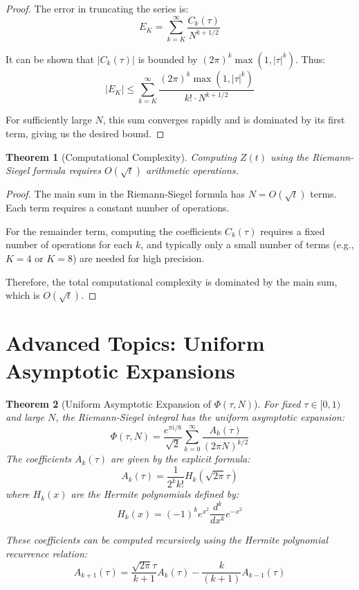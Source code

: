 \documentclass{article}
\newtheorem{theorem}{Theorem}
\begin{document}
\begin{proof}
The error in truncating the series is:
\[
E_K = \sum_{k=K}^{\infty} \frac{C_k(\tau)}{N^{k+1/2}}
\]

It can be shown that $|C_k(\tau)|$ is bounded by $(2\pi)^k \max(1, |\tau|^k)$. Thus:
\[
|E_K| \leq \sum_{k=K}^{\infty} \frac{(2\pi)^k \max(1, |\tau|^k)}{k! \cdot N^{k+1/2}}
\]

For sufficiently large $N$, this sum converges rapidly and is dominated by its first term, giving us the desired bound.
\end{proof}

\begin{theorem}[Computational Complexity]
Computing $Z(t)$ using the Riemann-Siegel formula requires $O(\sqrt{t})$ arithmetic operations.
\end{theorem}

\begin{proof}
The main sum in the Riemann-Siegel formula has $N = O(\sqrt{t})$ terms. Each term requires a constant number of operations.

For the remainder term, computing the coefficients $C_k(\tau)$ requires a fixed number of operations for each $k$, and typically only a small number of terms (e.g., $K = 4$ or $K = 8$) are needed for high precision.

Therefore, the total computational complexity is dominated by the main sum, which is $O(\sqrt{t})$.
\end{proof}

\section{Advanced Topics: Uniform Asymptotic Expansions}

\begin{theorem}[Uniform Asymptotic Expansion of $\Phi(\tau, N)$]
For fixed $\tau \in [0,1)$ and large $N$, the Riemann-Siegel integral has the uniform asymptotic expansion:
\[
\Phi(\tau, N) = \frac{e^{\pi i/8}}{\sqrt{2}} \sum_{k=0}^{\infty} \frac{A_k(\tau)}{(2\pi N)^{k/2}}
\]
The coefficients $A_k(\tau)$ are given by the explicit formula:
\[
A_k(\tau) = \frac{1}{2^k k!} H_k(\sqrt{2\pi}\tau)
\]
where $H_k(x)$ are the Hermite polynomials defined by:
\[
H_k(x) = (-1)^k e^{x^2} \frac{d^k}{dx^k} e^{-x^2}
\]

These coefficients can be computed recursively using the Hermite polynomial recurrence relation:
\[
A_{k+1}(\tau) = \frac{\sqrt{2\pi}\tau}{k+1} A_k(\tau) - \frac{k}{(k+1)} A_{k-1}(\tau)
\]
\end{theorem}
\end{document}
